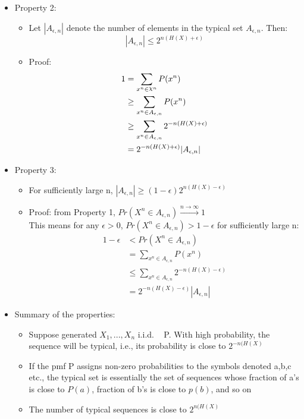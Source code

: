 \documentclass[12pt]{article}
\DeclareRobustCommand{\rchi}{{\mathpalette\irchi\relax}}
\newcommand{\irchi}[2]{\raisebox{\depth}{$#1\chi$}} %
\begin{document}
\begin{itemize}
\begin{itemize}
\begin{itemize}
\end{itemize}
\item Property 2:
\begin{itemize}
\item Let $|A_{\epsilon,n}|$ denote the number of elements in the typical set $A_{\epsilon,n}$. Then:
$$ |A_{\epsilon,n}| \le 2^{n(H(X)+\epsilon )}$$
\item Proof:
\begin{align*}
1  &= \sum_{x^n \in \rchi ^n }P(x^n) \\
 & \ge \sum_{x^n \in A_{\epsilon,n}} P(x^n)\\
 & \ge \sum_{x^n \in A_{\epsilon,n}} 2^{-n(H(X)+\epsilon)}\\
 & = 2^{-n(H(X)+\epsilon)} |A_{\epsilon,n}|\\
\end{align*}
\end{itemize}
\item Property 3:
\begin{itemize}
\item For sufficiently large n, $|A_{\epsilon,n}| \ge (1- \epsilon ) 2^{n(H(X)-\epsilon)}$
\item Proof: from Property 1, $ Pr(X^n \in A_{\epsilon,n}) \xrightarrow{n\rightarrow \infty} 1$ \\
This means for any $\epsilon > 0$,   $Pr(X^n \in A_{\epsilon,n}) > 1- \epsilon$ for sufficiently large n:
\begin{align*}
1 - \epsilon &< Pr(X^n \in A_{\epsilon,n})\\
&= \sum_{x^n \in A_{\epsilon,n}} P(x^n)\\
&\le \sum_{x^n \in A_{\epsilon,n}} 2^{-n(H(X)-\epsilon)}\\
&= 2^{-n(H(X)-\epsilon)} |A_{\epsilon,n}|
\end{align*}
\end{itemize}
\item Summary of the properties:
\begin{itemize}
\item Suppose generated $X_1,...,X_n$ i.i.d. ~ P. With high probability, the sequence will be typical, i.e., its probability is close to $2^{-n(H(X)}$
\item If the pmf P assigns non-zero probabilities to the symbols denoted a,b,c etc., the typical set is essentially the set of sequences whose fraction of a's is close to $P(a)$, fraction of b's is close to $p(b)$, and so on
\item The number of typical sequences is close to  $2^{n(H(X)}$
\end{itemize}
\end{itemize}
\end{itemize}
\end{document}
